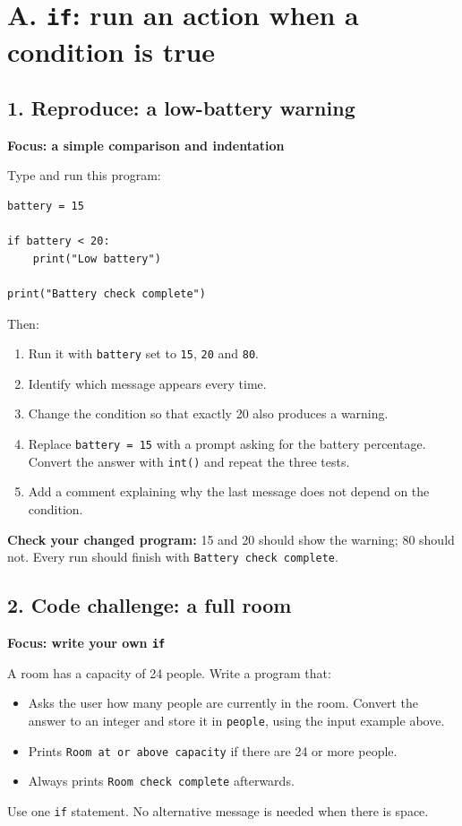 \documentclass[12pt,a4paper]{article}
\begin{document}
\section*{A. \texttt{if}: run an action when a condition is true}
\subsection*{1. Reproduce: a low-battery warning}
\textbf{Focus: a simple comparison and indentation}

Type and run this program:

\begin{minipage}{\linewidth}
\begin{lstlisting}
battery = 15

if battery < 20:
    print("Low battery")

print("Battery check complete")
\end{lstlisting}
\end{minipage}
\par
Then:

\begin{enumerate}
\item Run it with \texttt{battery} set to \texttt{15}, \texttt{20} and \texttt{80}.
\item Identify which message appears every time.
\item Change the condition so that exactly 20 also produces a warning.
\item Replace \texttt{battery = 15} with a prompt asking for the battery percentage. Convert the answer with \texttt{int()} and repeat the three tests.
\item Add a comment explaining why the last message does not depend on the condition.
\end{enumerate}
\textbf{Check your changed program:} 15 and 20 should show the warning; 80 should not. Every run should finish with \texttt{Battery check complete}.

\subsection*{2. Code challenge: a full room}
\textbf{Focus: write your own \texttt{if}}

A room has a capacity of 24 people. Write a program that:

\begin{itemize}
\item Asks the user how many people are currently in the room. Convert the answer to an integer and store it in \texttt{people}, using the input example above.
\item Prints \texttt{Room at or above capacity} if there are 24 or more people.
\item Always prints \texttt{Room check complete} afterwards.
\end{itemize}
Use one \texttt{if} statement. No alternative message is needed when there is space.
\end{document}
